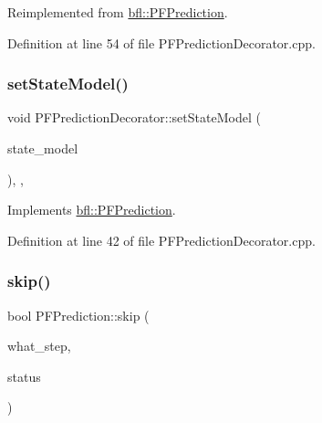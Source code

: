 Reimplemented from \mbox{\hyperlink{classbfl_1_1PFPrediction_ada843698204584e97d4ff6728c8e8264}{bfl\+::\+P\+F\+Prediction}}.



Definition at line 54 of file P\+F\+Prediction\+Decorator.\+cpp.

\mbox{\label{classbfl_1_1PFPredictionDecorator_ad269dfbdecf19d67717a8bc44f0bd286}} 
\subsubsection{\texorpdfstring{set\+State\+Model()}{setStateModel()}}
{\footnotesize\ttfamily void P\+F\+Prediction\+Decorator\+::set\+State\+Model (\begin{DoxyParamCaption}\item[{std\+::unique\+\_\+ptr$<$ \mbox{\hyperlink{classbfl_1_1StateModel}{State\+Model}} $>$}]{state\+\_\+model }\end{DoxyParamCaption})\hspace{0.3cm}{\ttfamily [override]}, {\ttfamily [protected]}, {\ttfamily [virtual]}}



Implements \mbox{\hyperlink{classbfl_1_1PFPrediction_ac39683650d7f89c59f1426dd7743354e}{bfl\+::\+P\+F\+Prediction}}.



Definition at line 42 of file P\+F\+Prediction\+Decorator.\+cpp.

\mbox{\label{classbfl_1_1PFPrediction_a364cc35a151e5298c4024d681f3e04d9}} 
\subsubsection{\texorpdfstring{skip()}{skip()}}
{\footnotesize\ttfamily bool P\+F\+Prediction\+::skip (\begin{DoxyParamCaption}\item[{const std\+::string \&}]{what\+\_\+step,  }\item[{const bool}]{status }\end{DoxyParamCaption})\hspace{0.3cm}{\ttfamily [inherited]}}



